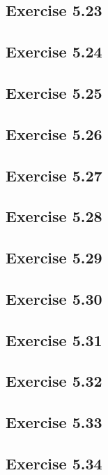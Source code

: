 \documentclass[../Marcus.tex]{subfiles}
\begin{document}
\subsection*{Exercise 5.23}

\subsection*{Exercise 5.24}

\subsection*{Exercise 5.25}

\subsection*{Exercise 5.26}

\subsection*{Exercise 5.27}

\subsection*{Exercise 5.28}

\subsection*{Exercise 5.29}

\subsection*{Exercise 5.30}

\subsection*{Exercise 5.31}

\subsection*{Exercise 5.32}

\subsection*{Exercise 5.33}

\subsection*{Exercise 5.34}
\end{document}
